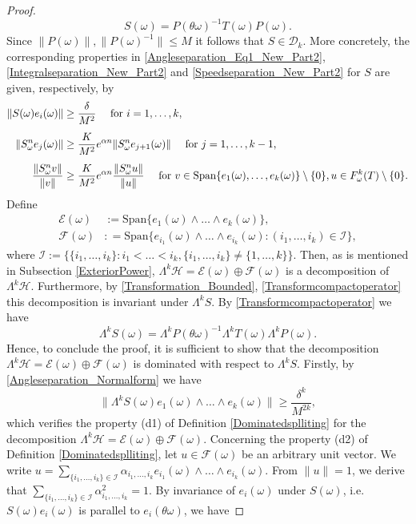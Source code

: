 \documentclass[pdflatex,sn-mathphys-num]{sn-jnl}%
\theoremstyle{thmstyleone}%
\theoremstyle{thmstyletwo}%
\theoremstyle{thmstylethree}%
\newcommand{\cH}{\mathcal{H}}
\newcommand{\cF}{\mathcal{F}}
\newcommand{\cE}{\mathcal{E}}
\numberwithin{equation}{section}
\begin{document}
\begin{proof}
\begin{equation}\label{Transformcompactoperator}
S(\omega)=P(\theta\omega)^{-1}T(\omega)P(\omega).
\end{equation}
Since $\|P(\omega)\|, \|P(\omega)^{-1}\|\leq M$ it follows that $S\in \mathcal D_k$. More concretely, the corresponding properties in \eqref{Angleseparation_Eq1_New_Part2}, \eqref{Integralseparation_New_Part2} and \eqref{Speedseparation_New_Part2} for $S$ are given, respectively, by 
\begin{align}
\|S(\omega)e_{i}(\omega)\|& \geq \frac{\delta}{M^2} 
\quad \hbox{ for } i=1,\dots,k,\label{Angleseparation_Normalform}\\[1ex]
\|S_{\omega}^n e_j(\omega)\|
& \geq \frac{K}{M^2} e^{\alpha n}
    \|S_{\omega}^n e_{j+1}(\omega)\|
\quad \hbox{ for } j=1,\dots,k-1,\label{Integralseparation_Normalform}\\[1ex]
\frac{\|S_{\omega}^n v\|}{\|v\|}
& \geq \frac{K}{M^2} e^{\alpha n}
    \frac{\|S_{\omega}^n u\|}{\|u\|}
\quad \hbox{ for } v\in  \mbox{Span}\{e_1(\omega),\dots,e_k(\omega)\}\setminus\{0\}, u\in F^{k}_{\omega}(T)\setminus\{0\}.\label{Speedseparation_Normalform}
\end{align}
Define 
\begin{align}
 \cE(\omega) & :=\mbox{Span}\{e_1(\omega)\wedge\dots\wedge e_k(\omega)\},\label{Stablespace}\\   
 \cF(\omega) & : =\mbox{Span}\big\{e_{i_1}(\omega)\wedge\dots\wedge e_{i_k}(\omega): (i_1,\dots, i_k)\in \mathcal I\},\label{Unstablespace}
\end{align}
where $\mathcal I:=\big\{\{i_1,\dots,i_k\}: i_1<\dots<i_k,\{i_1,\dots,i_k\}\not=\{1,\dots,k\}\big\}$. Then, as is mentioned in Subsection \ref{ExteriorPower}, $\Lambda^k\cH=\cE(\omega) \oplus  \cF(\omega)$  is a decomposition of $\Lambda^k\cH$. Furthermore,  by \eqref{Transformation_Bounded}, \eqref{Transformcompactoperator} this decomposition is invariant under $\Lambda^k S$. By \eqref{Transformcompactoperator} we have
\[
\Lambda^kS(\omega)=\Lambda^kP(\theta\omega)^{-1}\Lambda^kT(\omega)\Lambda^kP(\omega).
\]
Hence, to conclude the proof, it is sufficient to show that the decomposition $\Lambda^k\cH=\cE(\omega) \oplus  \cF(\omega)$  is dominated with respect to $\Lambda^k S$. Firstly, by \eqref{Angleseparation_Normalform} we have 
\[
\|\Lambda^kS(\omega) e_1(\omega)\wedge\dots\wedge e_k(\omega)\|\geq \frac{\delta^k}{M^{2k}},
\]
which verifies the property (d1) of Definition \ref{Dominatedsplliting} for the decomposition $\Lambda^k\cH=\cE(\omega) \oplus  \cF(\omega)$. Concerning the property (d2) of Definition \ref{Dominatedsplliting}, let $u\in \cF(\omega)$ be an arbitrary unit vector. We write $u=\sum_{\{i_1,\dots,i_k\}\in\mathcal I} \alpha_{i_1,\dots,i_k}e_{i_1}(\omega)\wedge\dots\wedge e_{i_k}(\omega)$. From $\|u\|=1$, we derive that $\sum_{\{i_1,\dots,i_k\}\in\mathcal I} \alpha_{i_1,\dots,i_k}^2=1$. By invariance of $e_i(\omega)$ under $S(\omega)$, i.e. $S(\omega)e_i(\omega)$ is parallel to $e_i(\theta\omega)$,  we have 

\end{proof}
\end{document}
